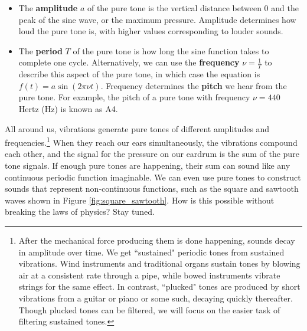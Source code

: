 \begin{itemize}
    \item The \textbf{amplitude} $a$ of the pure tone is the vertical distance between 0 and the peak of the sine wave, or the maximum pressure. Amplitude determines how loud the pure tone is, with higher values corresponding to louder sounds.
    \item The \textbf{period} $T$ of the pure tone is how long the sine function takes to complete one cycle. Alternatively, we can use the \textbf{frequency} $\nu = \frac{1}{T}$ to describe this aspect of the pure tone, in which case the equation is $f(t) = a\sin(2\pi\nu t)$. Frequency determines the \textbf{pitch} we hear from the pure tone. For example, the pitch of a pure tone with frequency $\nu = 440$ Hertz (Hz) is known as A4.
\end{itemize}

\par All around us, vibrations generate pure tones of different amplitudes and frequencies.\footnote{After the mechanical force producing them is done happening, sounds decay in amplitude over time. We get ``sustained" periodic tones from sustained vibrations. Wind instruments and traditional organs sustain tones by blowing air at a consistent rate through a pipe, while bowed instruments vibrate strings for the same effect. In contrast, ``plucked" tones are produced by short vibrations from a guitar or piano or some such, decaying quickly thereafter. Though plucked tones can be filtered, we will focus on the easier task of filtering sustained tones.} When they reach our ears simultaneously, the vibrations compound each other, and the signal for the pressure on our eardrum is the sum of the pure tone signals.\cite{Pierce} If enough pure tones are happening, their sum can sound like any continuous periodic function imaginable. We can even use pure tones to construct sounds that represent non-continuous functions, such as the square and sawtooth waves shown in Figure \ref{fig:square_sawtooth}. How is this possible without breaking the laws of physics? Stay tuned.

